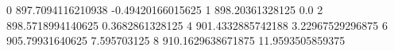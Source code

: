 0 897.7094116210938 -0.49420166015625
1 898.20361328125 0.0
2 898.5718994140625 0.3682861328125
4 901.4332885742188 3.22967529296875
6 905.79931640625 7.595703125
8 910.1629638671875 11.9593505859375
